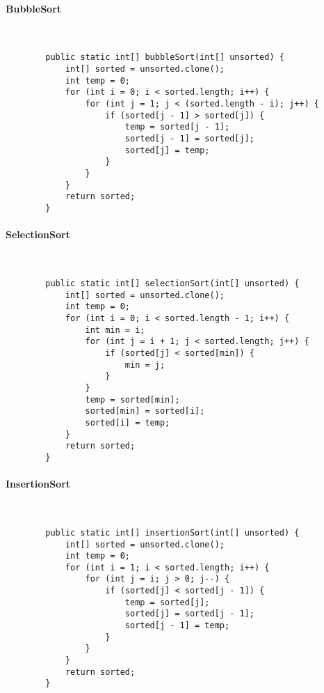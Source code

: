 \documentclass[./entry.tex]{subfiles}
\begin{document}
    \paragraph{BubbleSort} \mbox{}\\
    \begin{lstlisting}
        public static int[] bubbleSort(int[] unsorted) {
            int[] sorted = unsorted.clone();
            int temp = 0;
            for (int i = 0; i < sorted.length; i++) {
                for (int j = 1; j < (sorted.length - i); j++) {
                    if (sorted[j - 1] > sorted[j]) {
                        temp = sorted[j - 1];
                        sorted[j - 1] = sorted[j];
                        sorted[j] = temp;
                    }
                }
            }
            return sorted;
        }
    \end{lstlisting}

    \paragraph{SelectionSort} \mbox{}\\
    \begin{lstlisting}
        public static int[] selectionSort(int[] unsorted) {
            int[] sorted = unsorted.clone();
            int temp = 0;
            for (int i = 0; i < sorted.length - 1; i++) {
                int min = i;
                for (int j = i + 1; j < sorted.length; j++) {
                    if (sorted[j] < sorted[min]) {
                        min = j;
                    }
                }
                temp = sorted[min];
                sorted[min] = sorted[i];
                sorted[i] = temp;
            }
            return sorted;
        }
    \end{lstlisting}

    \paragraph{InsertionSort} \mbox{}\\
    \begin{lstlisting}
        public static int[] insertionSort(int[] unsorted) {
            int[] sorted = unsorted.clone();
            int temp = 0;
            for (int i = 1; i < sorted.length; i++) {
                for (int j = i; j > 0; j--) {
                    if (sorted[j] < sorted[j - 1]) {
                        temp = sorted[j];
                        sorted[j] = sorted[j - 1];
                        sorted[j - 1] = temp;
                    }
                }
            }
            return sorted;
        }
    \end{lstlisting}
\end{document}
